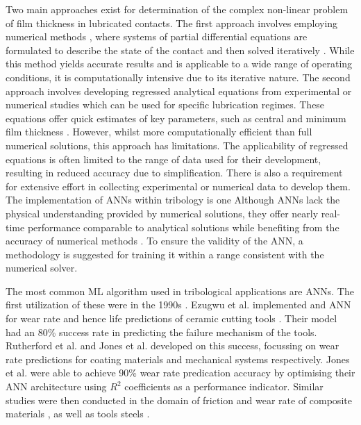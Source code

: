 Two main approaches exist for determination of the complex non-linear problem of film thickness in lubricated contacts. The first approach involves employing numerical methods \cite{Dowson1959}, where systems of partial differential equations are formulated to describe the state of the contact and then solved iteratively \cite{Gohar2018}. While this method yields accurate results and is applicable to a wide range of operating conditions, it is computationally intensive due to its iterative nature. The second approach involves developing regressed analytical equations from experimental or numerical studies which can be used for specific lubrication regimes. These equations offer quick estimates of key parameters, such as central \cite{Dowson1979} and minimum film thickness \cite{Dowson1967}. However, whilst more computationally efficient than full numerical solutions, this approach has limitations. The applicability of regressed equations is often limited to the range of data used for their development, resulting in reduced accuracy due to simplification. There is also a requirement for extensive effort in collecting experimental or numerical data to develop them. The implementation of ANNs within tribology is one  Although ANNs lack the physical understanding provided by numerical solutions, they offer nearly real-time performance comparable to analytical solutions while benefiting from the accuracy of numerical methods \cite{EchavarriOtero2014}. To ensure the validity of the ANN, a methodology is suggested for training it within a range consistent with the numerical solver.

The most common ML algorithm used in tribological applications are ANNs. The first utilization of these were in the 1990s \cite{Argatov2019}. Ezugwu et al. implemented and ANN for wear rate and hence life predictions of ceramic cutting tools \cite{Ezugwu1995}. Their model had an 80\% success rate in predicting the failure mechanism of the tools. Rutherford et al. \cite{Rutherford1996} and Jones et al. \cite{Jones1997} developed on this success, focussing on wear rate predictions for coating materials and mechanical systems respectively. Jones et al. were able to achieve 90\% wear rate predication accuracy by optimising their ANN architecture using $R^2$ coefficients as a performance indicator. Similar studies were then conducted in the domain of friction and wear rate of composite materials \cite{Genel2003} \cite{Hayajneh2009} \cite{Zhang2002}, as well as tools steels \cite{Cavaleri2019}. 

